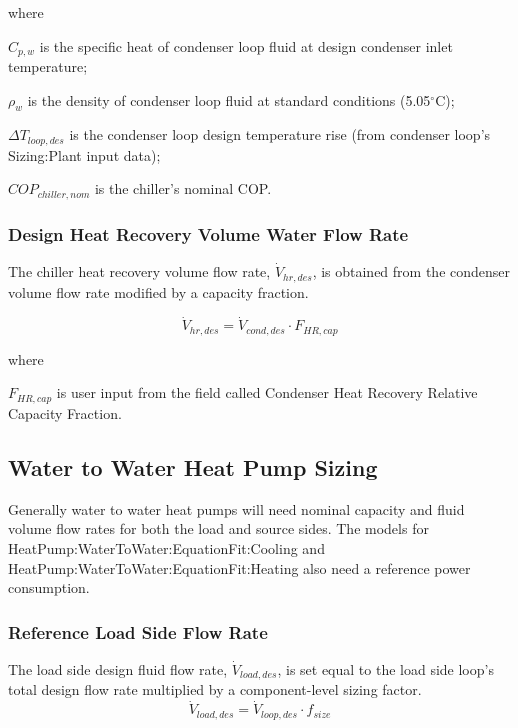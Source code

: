 where

\( C_{p,w} \) is the specific heat of condenser loop fluid at design condenser inlet temperature;

\( \rho_w \) is the density of condenser loop fluid at standard conditions (5.05\(^{\circ}\)C);

\( \Delta T_{loop,des} \) is the condenser loop design temperature rise (from condenser loop's Sizing:Plant input data);

\( COP_{chiller,nom} \) is the chiller's nominal COP.

\subsubsection{Design Heat Recovery Volume Water Flow Rate}\label{design-heat-recovery-chiller-volume-water-flow-rate}

The chiller heat recovery volume flow rate, \( \dot V_{hr,des} \), is obtained from the condenser volume flow rate modified by a capacity fraction.

\begin{equation}
\dot V_{hr,des} = \dot V_{cond,des} \cdot F_{HR,cap}
\end{equation}

where

\( F_{HR,cap} \) is user input from the field called Condenser Heat Recovery Relative Capacity Fraction.


\subsection{Water to Water Heat Pump Sizing}\label{WWHP-sizing}

Generally water to water heat pumps will need nominal capacity and fluid volume flow rates for both the load and source sides.  The models for HeatPump:WaterToWater:EquationFit:Cooling and HeatPump:WaterToWater:EquationFit:Heating also need a reference power consumption.

\subsubsection{Reference Load Side Flow Rate}\label{WWHP-ref-load-side-flow-rate}

The load side design fluid flow rate, \( \dot V_{load,des} \), is set equal to the load side loop's total design flow rate multiplied by a component-level sizing factor.
\begin{equation}
\dot V_{load,des} = \dot V_{loop,des} \cdot f_{size}
\end{equation}

